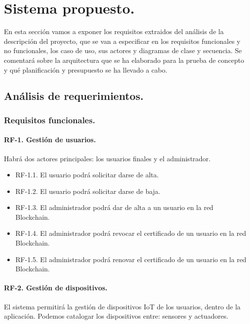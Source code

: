 \section{Sistema propuesto.}

En esta sección vamos a exponer los requisitos extraidos del análisis de la descripción del proyecto, que se van a 
especificar en los requisitos funcionales y no funcionales, los caso de uso, sus actores y diagramas de clase y secuencia.
Se comentará sobre la arquitectura que se ha elaborado para la prueba de concepto y qué planificación y presupuesto se
ha llevado a cabo.

\subsection{Análisis de requerimientos.}

\subsubsection{Requisitos funcionales.}

\paragraph{RF-1. Gestión de usuarios.} Habrá dos actores principales: los usuarios finales y el administrador.

\begin{itemize}
    \item[] RF-1.1. El usuario podrá solicitar darse de alta.
    \item[] RF-1.2. El usuario podrá solicitar darse de baja.
    \item[] RF-1.3. El administrador podrá dar de alta a un usuario en la red Blockchain.
    \item[] RF-1.4. El administrador podrá revocar el certificado de un usuario en la red Blockchain.
    \item[] RF-1.5. El administrador podrá renovar el certificado de un usuario en la red Blockchain.
\end{itemize}

\paragraph{RF-2. Gestión de dispositivos.} El sistema permitirá la gestión de dispositivos IoT de los usuarios, dentro de 
la aplicación. Podemos catalogar los dispositivos entre: sensores y actuadores.

